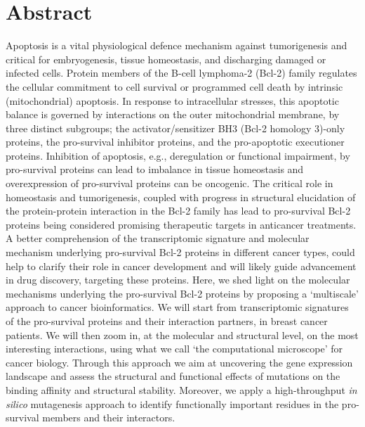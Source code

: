 \documentclass[10pt,letterpaper]{article}
\begin{document}
\section*{Abstract}
Apoptosis is a vital physiological defence mechanism against tumorigenesis and critical for embryogenesis, tissue homeostasis, and discharging damaged or infected cells.
Protein members of the B-cell lymphoma-2 (Bcl-2) family regulates the cellular commitment to cell survival or programmed cell death by intrinsic (mitochondrial) apoptosis. In response to intracellular stresses, this apoptotic balance is governed by interactions on the outer mitochondrial membrane, by three distinct subgroups; the activator/sensitizer BH3 (Bcl-2 homology 3)-only proteins, the pro-survival inhibitor proteins, and the pro-apoptotic executioner proteins. Inhibition of apoptosis, e.g., deregulation or functional impairment, by pro-survival proteins can lead to imbalance in tissue homeostasis and overexpression of pro-survival proteins can be oncogenic.
The critical role in homeostasis and tumorigenesis, coupled with progress in structural elucidation of the protein-protein interaction in the Bcl-2 family has lead to pro-survival Bcl-2 proteins being considered promising therapeutic targets in anticancer treatments. A better comprehension of the transcriptomic signature and molecular mechanism underlying pro-survival Bcl-2 proteins in different cancer types, could help to clarify their role in cancer development and will likely guide advancement in drug discovery, targeting these proteins.
Here, we shed light on the molecular mechanisms underlying the pro-survival Bcl-2 proteins by proposing a ‘multiscale’ approach to cancer bioinformatics. We will start from transcriptomic signatures of the pro-survival proteins and their interaction partners, in breast cancer patients. We will then zoom in, at the molecular and structural level, on the most interesting interactions, using what we call ‘the computational microscope’ for cancer biology. Through this approach we aim at uncovering the gene expression landscape and assess the structural and functional effects of mutations on the binding affinity and structural stability. Moreover, we apply a high-throughput \textit{in silico} mutagenesis approach to identify functionally important residues in the pro-survival members and their interactors.

\linenumbers

\end{document}

